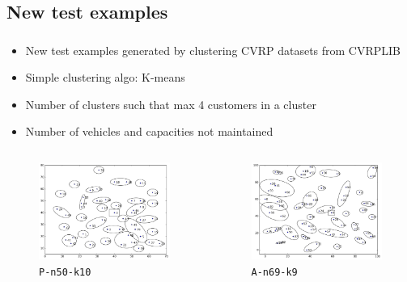 \documentclass[11pt]{beamer}
\begin{document}
\subsection{New test examples}
\begin{frame}
\frametitle{\subsecname}
\begin{itemize}
\item New test examples generated by clustering CVRP datasets from CVRPLIB \footnotemark
\item Simple clustering algo: K-means
\item Number of clusters such that max 4 customers in a cluster
\item Number of vehicles and capacities not maintained
\end{itemize}
\begin{columns}[t,onlytextwidth]

\begin{figure}
\centering
\includegraphics[width=\linewidth]{Images/P-n50-k10-c30_map.png}
\caption{\texttt{P-n50-k10}}
\end{figure}


\begin{figure}
\centering
\includegraphics[width=\linewidth]{Images/A-n69-k9-c31_map.png}
\caption{\texttt{A-n69-k9}}
\end{figure}


\end{columns}
\end{frame}
\end{document}
